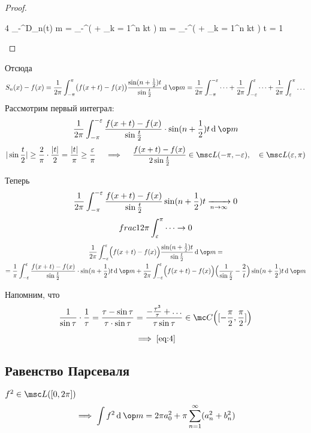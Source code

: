 \begin{proof}
	\begin{equ}4
		 \int_{-\pi}^\pi D_n(t) \di \op m =  \pi \int_{-\pi}^\pi \Bigl(  + \sum_{k = 1}^n \cos kt \Bigr) \di \op m =  \pi \int_{-\pi}^\pi \bigl(  + \sum_{k = 1}^n \cos kt \bigr) \di \op t = 1
	\end{equ}
\end{proof}

Отсюда
$$ S_n(x) - f(x) = \frac1{2\pi} \int_{-\pi}^\pi \bigl( f(x + t) - f(x) \bigr) \frac{\sin(n + \frac12)t}{\sin \frac t2} \di \op m =
\frac1{2\pi} \int_{-\pi}^{-\eps} \dots + \frac1{2\pi} \int_{-\eps}^\eps \dots + \frac1{2\pi} \int_\eps^\pi \dots $$
Рассмотрим первый интеграл:
$$ \frac1{2\pi} \int_{-\pi}^{-\eps} \frac{f(x + t) - f(x)}{\sin \frac t2} \cdot \sin (n + \frac12)t \di \op m $$
$$ |\sin \frac t2 | \ge \frac 2\pi \cdot \frac{|t|}2 = \frac{|t|}\pi \ge \frac \eps \pi \quad \implies \quad \frac{f(x + t) - f(x)}{2 \sin \frac t2} \in \msc L(-\pi, -\eps), \quad \in \msc L(\eps, \pi) $$

Теперь
$$ \frac1{2\pi} \int_{-\pi}^{-\varepsilon} \frac{f(x + t) - f(x)}{\sin \frac t2} \sin(n + \frac12)t \xrightarrow[n \to \infty]{} 0 $$
$$ \\frac1{2\pi} \int_\varepsilon^\pi \dots \to 0 $$
\begin{multline*}
	\frac1{2\pi} \int_{-\eps}^\eps \Bigl( f(x + t) - f(x) \Bigr) \frac{\sin(n + \frac12)t}{\sin \frac t2} \di \op m = \\
	= \frac1 \pi \int_{-\eps}^\eps \frac{f(x + t) - f(x)}{\sin \frac t2} \cdot \sin (n + \frac12) t \di \op m + \frac1{2\pi} \int_{-\eps}^\eps \Bigl( f(x + t) - f(x) \Bigr) \Bigl( \frac1{\sin \frac t2} - \frac 2t \Bigr) \sin(n + \frac12)t \di \op m
\end{multline*}

Напомним, что
$$ \frac1{\sin \tau} \cdot \frac1\tau = \frac{\tau - \sin \tau}{\tau \cdot \sin \tau} = \frac{-\frac{\tau^3}\tau + \dots}{\tau \sin \tau} \in \mc C \Bigl( [-\frac\pi 2, \frac\pi2] \Bigr) $$

$$ \implies \eref4 $$

\subsection{Равенство Парсеваля}

\begin{theorem}
	$ f^2 \in \msc L([0, 2\pi]) $
	$$ \implies \int f^2 \di \op m = 2 \pi a_0^2 + \pi \sum_{n = 1}^\infty (a_n^2 + b_n^2) $$
\end{theorem}

